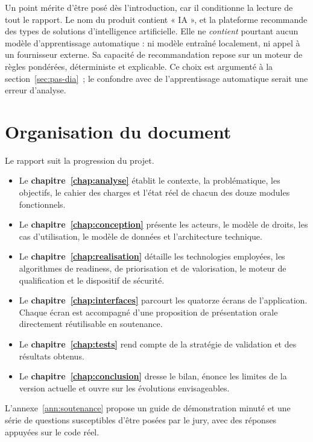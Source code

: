 Un point mérite d'être posé dès l'introduction, car il conditionne la lecture de tout
le rapport. Le nom du produit contient « IA », et la plateforme recommande des types
de solutions d'intelligence artificielle. Elle ne \emph{contient} pourtant aucun modèle
d'apprentissage automatique : ni modèle entraîné localement, ni appel à un fournisseur
externe. Sa capacité de recommandation repose sur un moteur de règles pondérées,
déterministe et explicable. Ce choix est argumenté à la
section~\ref{sec:pas-dia}~; le confondre avec de l'apprentissage automatique serait une
erreur d'analyse.

\section*{Organisation du document}

Le rapport suit la progression du projet.

\begin{itemize}
  \item Le \textbf{chapitre~\ref{chap:analyse}} établit le contexte, la problématique,
    les objectifs, le cahier des charges et l'état réel de chacun des douze modules
    fonctionnels.
  \item Le \textbf{chapitre~\ref{chap:conception}} présente les acteurs, le modèle de
    droits, les cas d'utilisation, le modèle de données et l'architecture technique.
  \item Le \textbf{chapitre~\ref{chap:realisation}} détaille les technologies employées,
    les algorithmes de readiness, de priorisation et de valorisation, le moteur de
    qualification et le dispositif de sécurité.
  \item Le \textbf{chapitre~\ref{chap:interfaces}} parcourt les quatorze écrans de
    l'application. Chaque écran est accompagné d'une proposition de présentation orale
    directement réutilisable en soutenance.
  \item Le \textbf{chapitre~\ref{chap:tests}} rend compte de la stratégie de validation
    et des résultats obtenus.
  \item Le \textbf{chapitre~\ref{chap:conclusion}} dresse le bilan, énonce les limites
    de la version actuelle et ouvre sur les évolutions envisageables.
\end{itemize}

L'annexe~\ref{ann:soutenance} propose un guide de démonstration minuté et une série de
questions susceptibles d'être posées par le jury, avec des réponses appuyées sur le
code réel.
